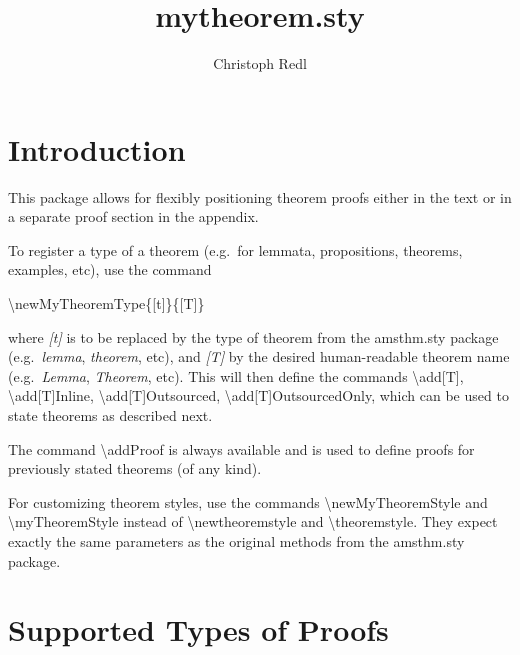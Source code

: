 \documentclass{article}
\title{mytheorem.sty}
\author{Christoph Redl}
\begin{document}
	\maketitle
	
	\section{Introduction}
	
		This package allows for flexibly positioning theorem proofs
		either in the text or in a separate proof section in the appendix.

		To register a type of a theorem (e.g.~for lemmata, propositions, theorems, examples, etc),
		use the command
		\begin{center}
			\textbackslash{}newMyTheoremType\{[t]\}\{[T]\}
		\end{center}
		where \emph{[t]} is to be replaced by the type of theorem from the amsthm.sty package
		(e.g.~\emph{lemma}, \emph{theorem}, etc), and \emph{[T]} by the desired human-readable theorem name (e.g.~\emph{Lemma}, \emph{Theorem}, etc).
		This will then define the commands \textbackslash{}add[T], \textbackslash{}add[T]Inline, \textbackslash{}add[T]Outsourced, \textbackslash{}add[T]OutsourcedOnly,
		which can be used to state theorems as described next.
		
		The command \textbackslash{}addProof is always available and is used to define proofs for previously stated theorems (of any kind).

		For customizing theorem styles, use the commands \textbackslash{}newMyTheoremStyle and \textbackslash{}myTheoremStyle
		instead of \textbackslash{}newtheoremstyle and \textbackslash{}theoremstyle. They expect exactly the same parameters as the original methods
		from the amsthm.sty package.
		
	\section{Supported Types of Proofs}
\end{document}
